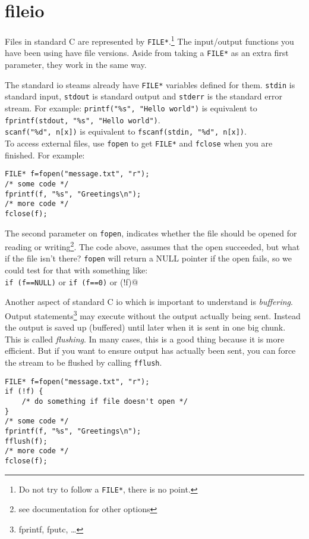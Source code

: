 
\chapter{fileio}

Files in standard C are represented by \texttt{FILE*}.\footnote{Do not try to follow a \texttt{FILE*}, there is no point.}
The input/output functions you have been using have file versions.
Aside from taking a \texttt{FILE*} as an extra first parameter, they work in the same way.

The standard io steams already have \texttt{FILE*} variables defined for them.
\texttt{stdin} is standard input, \texttt{stdout} is standard output and \texttt{stderr} is the standard error stream. 
For example:
\lstinline!printf("%s", "Hello world")! is equivalent to \lstinline!fprintf(stdout, "%s", "Hello world")!.\\
\lstinline!scanf("%d", n[x])! is equivalent to \lstinline!fscanf(stdin, "%d", n[x])!.\\

To access external files, use \texttt{fopen} to get \texttt{FILE*} and \texttt{fclose} when you are finished.
For example:
\begin{lstlisting}[numbers=none]
FILE* f=fopen("message.txt", "r");
/* some code */
fprintf(f, "%s", "Greetings\n");
/* more code */
fclose(f);
\end{lstlisting}
The second parameter on \texttt{fopen}, indicates whether the file should be opened for reading or writing\footnote{see documentation for other options}.
The code above, assumes that the open succeeded, but what if the file isn't there?
\texttt{fopen} will return a NULL pointer if the open fails, so we could test for that with something like:\\
\lstinline!if (f==NULL)! or \lstinline!if (f==0)! or \lstinline@if (!f)@

Another aspect of standard C io which is important to understand is \emph{buffering}.
Output statements\footnote{fprintf, fputc, \ldots} may execute without the output actually being sent.
Instead the output is saved up (buffered) until later when it is sent in one big chunk.
This is called \emph{flushing}.
In many cases, this is a good thing because it is more efficient.
But if you want to ensure output has actually been sent, you can force the stream to be flushed by calling \texttt{fflush}.
\begin{lstlisting}[numbers=none]
FILE* f=fopen("message.txt", "r");
if (!f) {
    /* do something if file doesn't open */
}
/* some code */
fprintf(f, "%s", "Greetings\n");
fflush(f);
/* more code */
fclose(f);
\end{lstlisting}

